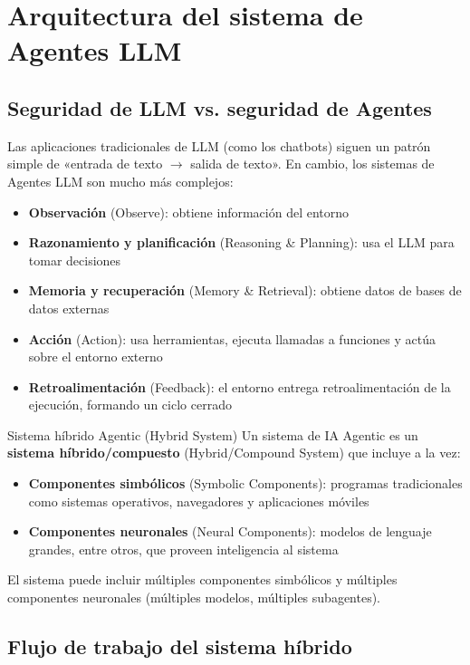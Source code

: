 \section{Arquitectura del sistema de Agentes LLM}

\subsection{Seguridad de LLM vs. seguridad de Agentes}

Las aplicaciones tradicionales de LLM (como los chatbots) siguen un patrón simple de «entrada de texto $\to$ salida de texto». En cambio, los sistemas de Agentes LLM son mucho más complejos:

\begin{itemize}
    \item \textbf{Observación} (Observe): obtiene información del entorno
    \item \textbf{Razonamiento y planificación} (Reasoning \& Planning): usa el LLM para tomar decisiones
    \item \textbf{Memoria y recuperación} (Memory \& Retrieval): obtiene datos de bases de datos externas
    \item \textbf{Acción} (Action): usa herramientas, ejecuta llamadas a funciones y actúa sobre el entorno externo
    \item \textbf{Retroalimentación} (Feedback): el entorno entrega retroalimentación de la ejecución, formando un ciclo cerrado
\end{itemize}

\begin{importantbox}{Sistema híbrido Agentic (Hybrid System)}
Un sistema de IA Agentic es un \textbf{sistema híbrido/compuesto} (Hybrid/Compound System) que incluye a la vez:
\begin{itemize}
    \item \textbf{Componentes simbólicos} (Symbolic Components): programas tradicionales como sistemas operativos, navegadores y aplicaciones móviles
    \item \textbf{Componentes neuronales} (Neural Components): modelos de lenguaje grandes, entre otros, que proveen inteligencia al sistema
\end{itemize}
El sistema puede incluir múltiples componentes simbólicos y múltiples componentes neuronales (múltiples modelos, múltiples subagentes).
\end{importantbox}

\subsection{Flujo de trabajo del sistema híbrido}


